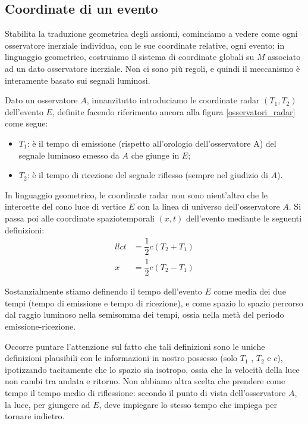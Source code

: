 \subsection{Coordinate di un evento}
Stabilita la traduzione geometrica degli assiomi, cominciamo a vedere come
ogni osservatore inerziale individua, con le sue coordinate relative, ogni evento;
in linguaggio geometrico, costruiamo il sistema di coordinate globali su $M$
associato ad un dato osservatore inerziale. Non ci sono più regoli, e quindi il
meccanismo è interamente basato sui segnali luminosi.

Dato un osservatore $A$, innanzitutto introduciamo le coordinate radar
$(T_1 , T_2)$ dell'evento $E$, definite facendo riferimento ancora alla figura
\ref{osservatori_radar} come segue:
\begin{itemize}
 \item $T_1$: è il tempo di emissione (rispetto all'orologio dell'osservatore A) del
segnale luminoso emesso da $A$ che giunge in $E$;
 \item $T_2$: è il tempo di ricezione del segnale riflesso (sempre nel giudizio di $A$).

\end{itemize}

In linguaggio geometrico, le coordinate radar non sono nient'altro che le
intercette del cono luce di vertice $E$ con la linea di universo dell'osservatore
$A$.
Si passa poi alle coordinate spaziotemporali $(x, t)$ dell'evento mediante le
seguenti definizioni:
\begin{equation}
 \begin{aligned}{ll}
  ct &= \dfrac{1}{2} c(T_2 + T_1 ) \\
  x &= \dfrac{1}{2} c(T_2 - T_1 )
 \end{aligned}
\end{equation}

Sostanzialmente stiamo definendo il tempo dell'evento $E$ come media dei
due tempi (tempo di emissione e tempo di ricezione), e come spazio lo spazio
percorso dal raggio luminoso nella semisomma dei tempi, ossia nella metà
del periodo emissione-ricezione.

Occorre puntare l'attenzione sul fatto che tali definizioni sono le uniche
definizioni plausibili con le informazioni in nostro possesso (solo $T_1$ , $T_2$ e
$c$), ipotizzando tacitamente che lo spazio sia isotropo, ossia che la velocità
della luce non cambi tra andata e ritorno. Non abbiamo altra scelta che
prendere come tempo il tempo medio di riflessione: secondo il punto di vista
dell'osservatore $A$, la luce, per giungere ad $E$, deve impiegare lo stesso tempo
che impiega per tornare indietro.

